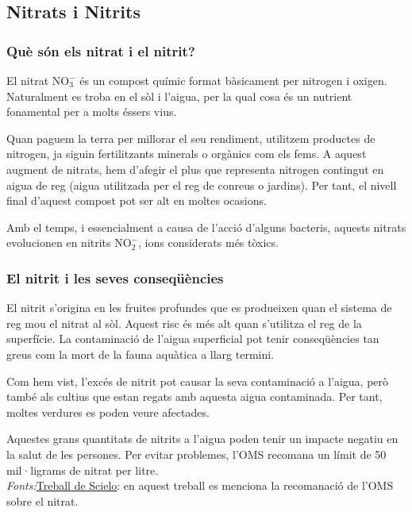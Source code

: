 \subsection{Nitrats i Nitrits} \label{subsec:nitratsnitrits}
\subsubsection{Què són els nitrat i el nitrit?}
El nitrat \(\mathrm{NO_3^-}\) és un compost químic format bàsicament per nitrogen i oxigen. Naturalment es troba en el sòl i l'aigua, per la qual cosa és un nutrient fonamental per a molts éssers vius.

Quan paguem la terra per millorar el seu rendiment, utilitzem productes de nitrogen, ja siguin fertilitzants minerals o orgànics com els fems. A aquest augment de nitrats, hem d'afegir el plus que representa nitrogen contingut en aigua de reg (aigua utilitzada per el reg de conreus o jardins). Per tant, el nivell final d'aquest compost pot ser alt en moltes ocasions.

Amb el temps, i essencialment a causa de l'acció d'alguns bacteris, aquests nitrats evolucionen en nitrits \(\mathrm{NO_2^-}\), ions considerats més tòxics.
\subsubsection{El nitrit i les seves conseqüències}
El nitrit s'origina en les fruites profundes que es produeixen quan el sistema de reg mou el nitrat al sòl. Aquest risc és més alt quan s'utilitza el reg de la superfície. La contaminació de l'aigua superficial pot tenir conseqüències tan greus com la mort de la fauna aquàtica a llarg termini.

Com hem vist, l'excés de nitrit pot causar la seva contaminació a l'aigua, però també als cultius que estan regats amb aquesta aigua contaminada. Per tant, moltes verdures es poden veure afectades.

Aquestes grans quantitats de nitrits a l'aigua poden tenir un impacte negatiu en la salut de les persones. Per evitar problemes, l'OMS recomana un límit de 50 mil·ligrams de nitrat per litre.\\
\textit{Fonts:}\href{https://scielo.isciii.es/scielo.php?script=sci_arttext&pid=S0213-91112015000300011}{Treball de Scielo}: en aquest treball es menciona la recomanació de l'OMS sobre el nitrat.
